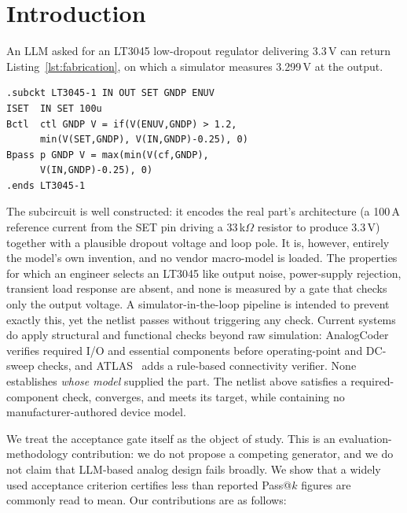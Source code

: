 \section{Introduction}
\label{sec:intro}

An LLM asked for an LT3045 low-dropout regulator delivering 3.3\,V can return
Listing~\ref{lst:fabrication}, on which a simulator measures 3.299\,V at the
output.

\begin{lstlisting}[float=tbp, caption={A netlist that measures correctly and
  contains no LT3045.}, label={lst:fabrication}]
.subckt LT3045-1 IN OUT SET GNDP ENUV
ISET  IN SET 100u
Bctl  ctl GNDP V = if(V(ENUV,GNDP) > 1.2,
      min(V(SET,GNDP), V(IN,GNDP)-0.25), 0)
Bpass p GNDP V = max(min(V(cf,GNDP),
      V(IN,GNDP)-0.25), 0)
.ends LT3045-1
\end{lstlisting}

The subcircuit is well constructed: it encodes the real part's architecture
(a 100\,\textmu A reference current from the SET pin driving a
33\,k$\Omega$ resistor to produce 3.3\,V) together with a plausible dropout
voltage and loop pole. It is, however, entirely the model's own invention,
and no vendor macro-model is loaded. The properties for which an engineer
selects an LT3045 like output noise, power-supply rejection, transient load
response are absent, and none is measured by a gate that checks only the
output voltage. A simulator-in-the-loop pipeline is intended to prevent
exactly this, yet the netlist passes without triggering any check. Current
systems do apply structural and functional checks beyond raw simulation:
AnalogCoder~\cite{b2} verifies required I/O and essential components before
operating-point and DC-sweep checks, and ATLAS~\cite{b19} adds a rule-based
connectivity verifier. None establishes \emph{whose model} supplied the part.
The netlist above satisfies a required-component check, converges, and meets
its target, while containing no manufacturer-authored device model.

We treat the acceptance gate itself as the object of study. This is an
evaluation-methodology contribution: we do not propose a competing generator,
and we do not claim that LLM-based analog design fails broadly. We show that a
widely used acceptance criterion certifies less than reported Pass@$k$ figures
are commonly read to mean. Our contributions are as follows:

